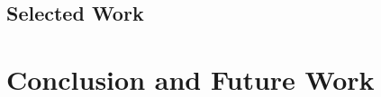 \documentclass[conference]{IEEEtran}
\begin{document}
\subsection{Selected Work}



\section{Conclusion and Future Work}


\end{document}
